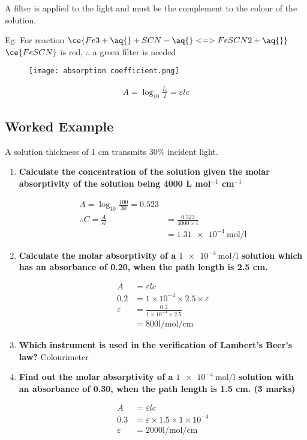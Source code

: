 	A filter is applied to the light and must be the complement to the colour of the solution.

	Eg: For reaction $\ce{Fe3+ \aq{} + SCN- \aq{} <=> FeSCN2+ \aq{}}$
	$\ce{FeSCN}$ is red, $\therefore$ a green filter is needed

	\begin{figure}[H]
		\centering
		\texttt{[image: absorption coefficient.png]}
	\end{figure}

	\begingroup
		\Large
		\begin{align*}
			A = \log_{10}{\frac{I_o}{I}} = \varepsilon lc
		\end{align*}
	\endgroup

	\newpage

	\subsection{Worked Example}
		A solution thickness of 1 cm transmits 30\% incident light.
		\begin{enumerate}
			\item \textbf{Calculate the concentration of the solution given the molar absorptivity of the solution being 4000 L mol$^{-1}$ cm$^{-1}$}
			
			\begin{align*}
				A = \log_{10}{\frac{100}{30}} = 0.523 \\
				\therefore C = \frac{A}{\varepsilon l} &= \frac{0.523}{4000 \times 1} \\
				&= \SI{1.31e-4}{\mole\per\litre}
			\end{align*}

			\item \textbf{Calculate the molar absorptivity of a $\SI{1e-4}{\mol\per\litre}$ solution which has an absorbance of 0.20, when the path length is 2.5 cm.}
			
			\begin{align*}
				A &= \varepsilon l c \\
				0.2 &= 1 \times 10^{-4} \times 2.5 \times \varepsilon \\
				\varepsilon &= \frac{0.2}{1 \times 10^{-4} \times 2.5} \\
				&= {800} \unit{\litre\per\mole\per\cm}
			\end{align*}

			\item \textbf{Which instrument is used in the verification of Lambert's Beer's law?}
			\subitem Colourimeter

			\item \textbf{Find out the molar absorptivity of a $\SI{1e-4}{\mole\per\litre}$ solution with an absorbance of 0.30, when the path length is 1.5 cm. (3 marks)}
			
			\begin{align*}
				A &= \varepsilon lc \\
				0.3 &= \varepsilon \times 1.5 \times 1 \times 10^{-4} \\
				\varepsilon &= 2000 \unit{\litre\per\mole\per\cm}
			\end{align*}
		\end{enumerate}

